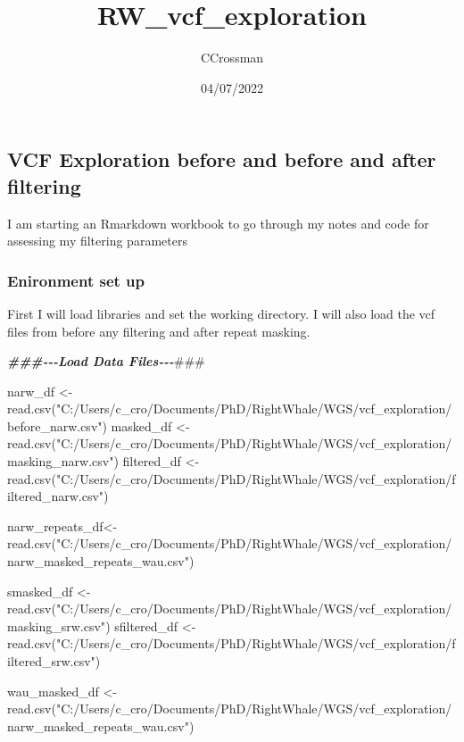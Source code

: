 \documentclass[
]{article}
\title{RW\_vcf\_exploration}
\author{CCrossman}
\date{04/07/2022}
\newenvironment{Shaded}{\begin{snugshade}}{\end{snugshade}}
\newcommand{\AlertTok}[1]{\textcolor[rgb]{0.94,0.16,0.16}{#1}}
\newcommand{\DocumentationTok}[1]{\textcolor[rgb]{0.56,0.35,0.01}{\textbf{\textit{#1}}}}
\newcommand{\FunctionTok}[1]{\textcolor[rgb]{0.00,0.00,0.00}{#1}}
\newcommand{\NormalTok}[1]{#1}
\newcommand{\OtherTok}[1]{\textcolor[rgb]{0.56,0.35,0.01}{#1}}
\newcommand{\StringTok}[1]{\textcolor[rgb]{0.31,0.60,0.02}{#1}}
\begin{document}
\maketitle

\hypertarget{vcf-exploration-before-and-before-and-after-filtering}{%
\subsection{VCF Exploration before and before and after
filtering}\label{vcf-exploration-before-and-before-and-after-filtering}}

I am starting an Rmarkdown workbook to go through my notes and code for
assessing my filtering parameters

\hypertarget{enironment-set-up}{%
\subsubsection{Enironment set up}\label{enironment-set-up}}

First I will load libraries and set the working directory. I will also
load the vcf files from before any filtering and after repeat masking.

\begin{Shaded}
\begin{Highlighting}[]
\DocumentationTok{\#\#\#{-}{-}{-}Load Data Files{-}{-}{-}}\AlertTok{\#\#\#}

\NormalTok{narw\_df }\OtherTok{\textless{}{-}} \FunctionTok{read.csv}\NormalTok{(}\StringTok{"C:/Users/c\_cro/Documents/PhD/RightWhale/WGS/vcf\_exploration/before\_narw.csv"}\NormalTok{)}
\NormalTok{masked\_df }\OtherTok{\textless{}{-}} \FunctionTok{read.csv}\NormalTok{(}\StringTok{"C:/Users/c\_cro/Documents/PhD/RightWhale/WGS/vcf\_exploration/masking\_narw.csv"}\NormalTok{)}
\NormalTok{filtered\_df }\OtherTok{\textless{}{-}} \FunctionTok{read.csv}\NormalTok{(}\StringTok{"C:/Users/c\_cro/Documents/PhD/RightWhale/WGS/vcf\_exploration/filtered\_narw.csv"}\NormalTok{)}

\NormalTok{narw\_repeats\_df}\OtherTok{\textless{}{-}} \FunctionTok{read.csv}\NormalTok{(}\StringTok{"C:/Users/c\_cro/Documents/PhD/RightWhale/WGS/vcf\_exploration/narw\_masked\_repeats\_wau.csv"}\NormalTok{)}

\NormalTok{smasked\_df }\OtherTok{\textless{}{-}} \FunctionTok{read.csv}\NormalTok{(}\StringTok{"C:/Users/c\_cro/Documents/PhD/RightWhale/WGS/vcf\_exploration/masking\_srw.csv"}\NormalTok{)}
\NormalTok{sfiltered\_df }\OtherTok{\textless{}{-}} \FunctionTok{read.csv}\NormalTok{(}\StringTok{"C:/Users/c\_cro/Documents/PhD/RightWhale/WGS/vcf\_exploration/filtered\_srw.csv"}\NormalTok{)}

\NormalTok{wau\_masked\_df }\OtherTok{\textless{}{-}} \FunctionTok{read.csv}\NormalTok{(}\StringTok{"C:/Users/c\_cro/Documents/PhD/RightWhale/WGS/vcf\_exploration/narw\_masked\_repeats\_wau.csv"}\NormalTok{)}
\end{Highlighting}
\end{Shaded}
\end{document}
